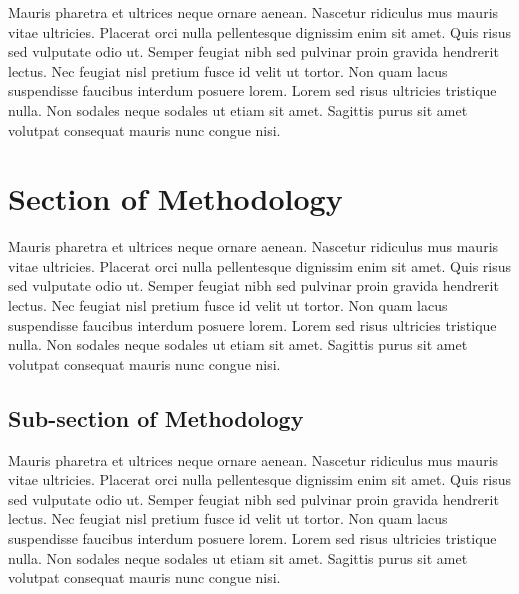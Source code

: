 Mauris pharetra et ultrices neque ornare aenean. Nascetur ridiculus mus mauris vitae ultricies. Placerat orci nulla pellentesque dignissim enim sit amet. Quis risus sed vulputate odio ut. Semper feugiat nibh sed pulvinar proin gravida hendrerit lectus. Nec feugiat nisl pretium fusce id velit ut tortor. Non quam lacus suspendisse faucibus interdum posuere lorem. Lorem sed risus ultricies tristique nulla. Non sodales neque sodales ut etiam sit amet. Sagittis purus sit amet volutpat consequat mauris nunc congue nisi.

\section{Section of Methodology}

Mauris pharetra et ultrices neque ornare aenean. Nascetur ridiculus mus mauris vitae ultricies. Placerat orci nulla pellentesque dignissim enim sit amet. Quis risus sed vulputate odio ut. Semper feugiat nibh sed pulvinar proin gravida hendrerit lectus. Nec feugiat nisl pretium fusce id velit ut tortor. Non quam lacus suspendisse faucibus interdum posuere lorem. Lorem sed risus ultricies tristique nulla. Non sodales neque sodales ut etiam sit amet. Sagittis purus sit amet volutpat consequat mauris nunc congue nisi. 

\subsection{Sub-section of Methodology}

Mauris pharetra et ultrices neque ornare aenean. Nascetur ridiculus mus mauris vitae ultricies. Placerat orci nulla pellentesque dignissim enim sit amet. Quis risus sed vulputate odio ut. Semper feugiat nibh sed pulvinar proin gravida hendrerit lectus. Nec feugiat nisl pretium fusce id velit ut tortor. Non quam lacus suspendisse faucibus interdum posuere lorem. Lorem sed risus ultricies tristique nulla. Non sodales neque sodales ut etiam sit amet. Sagittis purus sit amet volutpat consequat mauris nunc congue nisi.

